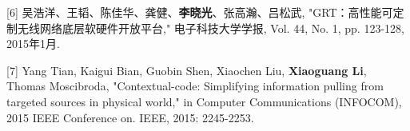\begin{description}
		\item{[6]} 吴浩洋、王韬、陈佳华、龚健、\textbf{李晓光}、张高瀚、吕松武, "GRT：高性能可定制无线网络底层软硬件开放平台," 电子科技大学学报, Vol. 44, No. 1, pp. 123-128, 2015年1月.

		\item{[7]} Yang Tian, Kaigui Bian, Guobin Shen, Xiaochen Liu, \textbf{Xiaoguang Li}, Thomas Moscibroda, "Contextual-code: Simplifying information pulling from targeted sources in physical world," in Computer Communications (INFOCOM), 2015 IEEE Conference on. IEEE, 2015: 2245-2253.

	\end{description}

\flushbottom %
